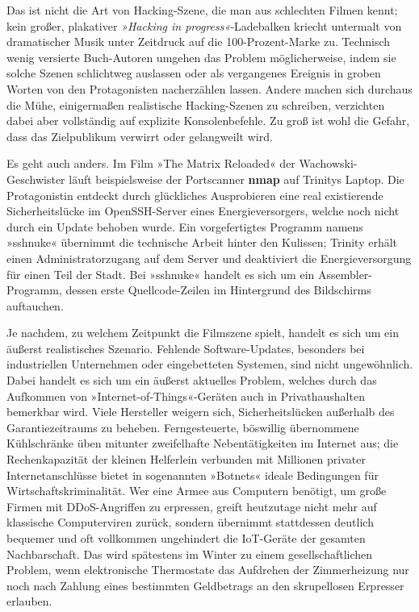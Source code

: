 Das ist nicht die Art von Hacking-Szene, die man aus schlechten Filmen kennt; kein großer, plakativer \textit{»Hacking in progress«}-Ladebalken kriecht untermalt von dramatischer Musik unter Zeitdruck auf die 100-Prozent-Marke zu. Technisch wenig versierte Buch-Autoren umgehen das Problem möglicherweise, indem sie solche Szenen schlichtweg auslassen oder als vergangenes Ereignis in groben Worten von den Protagonisten nacherzählen lassen. Andere machen sich durchaus die Mühe, einigermaßen realistische Hacking-Szenen zu schreiben, verzichten dabei aber vollständig auf explizite Konsolenbefehle. Zu groß ist wohl die Gefahr, dass das Zielpublikum verwirrt oder gelangweilt wird.

Es geht auch anders. Im Film »The Matrix Reloaded« der Wachowski-Geschwister läuft beispielsweise der Portscanner \textbf{nmap} auf Trinitys Laptop. Die Protagonistin entdeckt durch glückliches Ausprobieren eine real existierende Sicherheitslücke im OpenSSH-Server eines Energieversorgers, welche noch nicht durch ein Update behoben wurde. Ein vorgefertigtes Programm namens »sshnuke« übernimmt die technische Arbeit hinter den Kulissen; Trinity erhält einen Administratorzugang auf dem Server und deaktiviert die Energieversorgung für einen Teil der Stadt. Bei »sshnuke« handelt es sich um ein Assembler-Programm, dessen erste Quellcode-Zeilen im Hintergrund des Bildschirms auftauchen.

Je nachdem, zu welchem Zeitpunkt die Filmszene spielt, handelt es sich um ein äußerst realistisches Szenario. Fehlende Software-Updates, besonders bei industriellen Unternehmen oder eingebetteten Systemen, sind nicht ungewöhnlich. Dabei handelt es sich um ein äußerst aktuelles Problem, welches durch das Aufkommen von »Internet-of-Things«-Geräten auch in Privathaushalten bemerkbar wird. Viele Hersteller weigern sich, Sicherheitslücken außerhalb des Garantiezeitraums zu beheben. Ferngesteuerte, böswillig übernommene Kühlschränke üben mitunter zweifelhafte Nebentätigkeiten im Internet aus; die Rechenkapazität der kleinen Helferlein verbunden mit Millionen privater Internetanschlüsse bietet in sogenannten »Botnets« ideale Bedingungen für Wirtschaftskriminalität. Wer eine Armee aus Computern benötigt, um große Firmen mit DDoS-Angriffen zu erpressen, greift heutzutage nicht mehr auf klassische Computerviren zurück, sondern übernimmt stattdessen deutlich bequemer und oft vollkommen ungehindert die IoT-Geräte der gesamten Nachbarschaft. Das wird spätestens im Winter zu einem gesellschaftlichen Problem, wenn elektronische Thermostate das Aufdrehen der Zimmerheizung nur noch nach Zahlung eines bestimmten Geldbetrags an den skrupellosen Erpresser erlauben.

